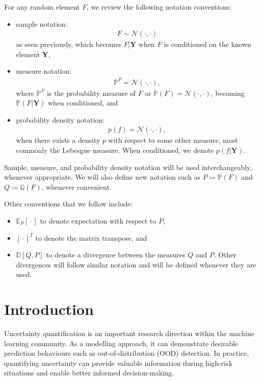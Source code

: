 \documentclass{article}
\newcommand{\wc}{\operatorname{{}\cdot{}}}
\numberwithin{equation}{section}
\begin{document}
For any random element $F$, we review the following notation conventions:
\begin{itemize}
    \setlength\itemsep{-0.25em}
    \item sample notation: 
        \begin{align}
            F \sim \mathcal{N}(\cdot, \cdot)
        \end{align}
        as seen previously, which becomes $F \vert \mathbf{Y}$ when $F$ is conditioned on the known element $\mathbf{Y}$,
    \item measure notation: 
        \begin{align}
            \mathbb{P}^F = \mathcal{N}(\cdot, \cdot),
        \end{align}
        where $\mathbb{P}^F$ is the probability measure of $F$ or $\mathbb{P}(F) = \mathcal{N}(\cdot, \cdot)$, becoming $\mathbb{P}(F \vert \mathbf{Y})$ when conditioned, and
    \item probability density notation: 
        \begin{align}
           p(f) = \mathcal{N}(\cdot, \cdot),
        \end{align}
        when there exists a density $p$ with respect to some other measure, most commonly the Lebesgue measure. 
        When conditioned, we denote $p(f\vert \mathbf{Y})$.
\end{itemize}
Sample, measure, and probability density notation will be used interchangeably, whenever appropriate. 
We will also define new notation such as $P \coloneqq \mathbb{P}(F)$ and $Q \coloneqq \mathbb{Q}(F)$, whenever convenient.

Other conventions that we follow include:
\begin{itemize}
    \setlength\itemsep{-0.25em}
    \item $\mathbb{E}_{P}[\wc]$ to denote expectation with respect to $P$,
    \item $\left[\wc\right]^T$ to denote the matrix transpose, and 
    \item $\mathbb{D}[Q, P]$ to denote a divergence between the measures $Q$ and $P$. Other divergences will follow similar notation and will be defined whenever they are used.
\end{itemize}
 

\newpage
\section{Introduction}
Uncertainty quantification is an important research direction within the machine learning community.
As a modelling approach, it can demonstrate desirable prediction behaviours such as out-of-distribution (OOD) detection. 
In practice, quantifying uncertainty can provide valuable information during high-risk situations and enable better informed decision-making.
\end{document}
